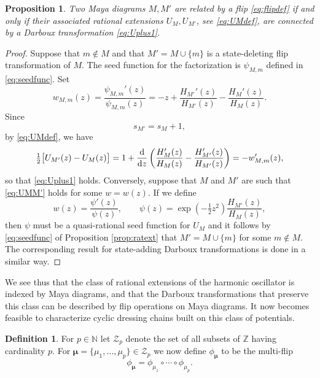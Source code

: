 \documentclass[10pt]{amsart}
\newtheorem{prop}[thm]{Proposition}
\theoremstyle{definition}
\newtheorem{definition}[thm]{Definition}
\numberwithin{equation}{section}
\numberwithin{figure}{section}
\newcommand{\N}{\mathbb{N}}
\newcommand{\Z}{\mathbb{Z}}
\newcommand{\bmu}{{\boldsymbol{\mu}}}
\renewcommand{\H}{H}%
\newcommand{\cZ}{\mathcal{Z}}
\newcommand{\ddz}{\frac{{\rm d}}{{\rm d}z}}
\newcommand{\ex}[1]{\exp(#1)}
\begin{document}
\begin{prop}
  \label{prop:UMflip}
  Two Maya diagrams $M, M'$ are related by a flip \eqref{eq:flipdef}
  if and only if their associated rational extensions $U_M,U_{M'}$, see \eqref{eq:UMdef}, are
  connected by a Darboux transformation \eqref{eq:Uplus1}.
\end{prop}
\begin{proof}
  Suppose that $m\notin M$ and that $M' = M \cup \{ m\}$ is a
  state-deleting flip transformation of $M$. The seed function for the factorization is $\psi_{M,m}$ defined in \eqref{eq:seedfunc}.   Set
  \begin{equation}
    \label{eq:f1statedelete}
    w_{M,m}(z) = \frac{\psi_{M,m}'(z)}{\psi_{M,m}(z)} = -z + \frac{\H_{M'}'(z)}{\H_{M'}(z)} - \frac{\H_{M}'(z)}{\H_{M}(z)}.
  \end{equation}
  Since
  \[ s_{M'} = s_M +1,\]
  by \eqref{eq:UMdef}, we have 
  \begin{equation}
    \label{eq:UMM'}
    \tfrac12\big[U_{M'}(z)-U_{M}(z)\big] = 1+ \ddz \left(\frac{\H_{M}'(z)}{\H_{M}(z)}-  \frac{\H_{M'}'(z)}{\H_{M'}(z)} \right) = -w_{M,m}'(z),
  \end{equation}
so that \eqref{eq:Uplus1} holds.
  Conversely, suppose that $M$ and $M'$ are such that \eqref{eq:UMM'}
  holds for some $w = w(z)$. If we define
  \[ w(z) = \frac{\psi'(z)}{\psi(z)},\qquad
   \psi(z) = \ex{-\tfrac12z^2}\frac{ \H_{M'}(z)}{\H_{M}(z)} ,\]
   then $\psi $ must be a quasi-rational seed function for $U_M$ and
   it follows by \eqref{eq:seedfunc} of Proposition \ref{prop:ratext} 
   that $M'= M\cup \{m\}$ for some $m\notin M$. The corresponding result for state-adding Darboux transformations is done in a similar way.
\end{proof}

We see thus that the class of rational extensions of the harmonic
oscillator is indexed by Maya diagrams, and that the Darboux
transformations that preserve this class can be described by flip
operations on Maya diagrams.
It now becomes feasible to characterize cyclic dressing chains built
on this class of potentials.

\begin{definition}
  \label{def:multiflip}
  For $p\in \N$ let $\cZ_p$ denote the set of all subsets of $\Z$
  having cardinality $p$.
  For $\bmu= \{ \mu_1,\ldots, \mu_p\}\in \cZ_p$ we now define
  $\phi_{\bmu}$ to be the multi-flip
   \begin{equation}
     \label{eq:phimudef}
     \phi_{\bmu}= \phi_{\mu_1} \circ \cdots \circ \phi_{\mu_{p}}.
\end{equation}
\end{definition}
\end{document}
